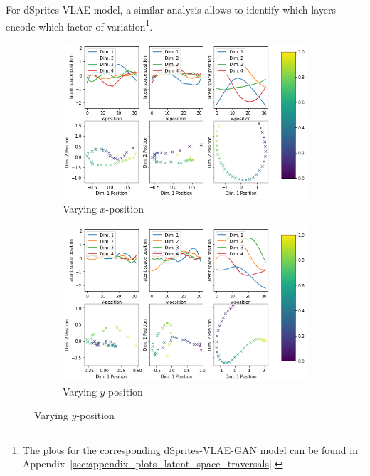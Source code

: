 For dSprites-\ac{VLAE} model, a similar analysis allows to identify which layers encode which factor of variation\footnote{The plots for the corresponding dSprites-\ac{VLAE}-\ac{GAN} model can be found in Appendix~\ref{sec:appendix_plots_latent_space_traversals}.}.
\begin{figure}
    \centering
    \begin{subfigure}{.48\textwidth}
        \centering
        \includegraphics[width=\textwidth]{images/latent_space_traversals/vlae_dsprites_left_latent_space_values.png}
        \caption{Varying $x$-position}
        \label{subfig:vlae_dsprites_latent_space_values_x}
    \end{subfigure}
    \hfill
    \begin{subfigure}{.48\textwidth}
        \centering
        \includegraphics[width=\textwidth]{images/latent_space_traversals/vlae_dsprites_bottom_latent_space_values.png}
        \caption{Varying $y$-position}
        \label{subfig:vlae_dsprites_latent_space_values_y}

\end{subfigure}
\end{figure}
